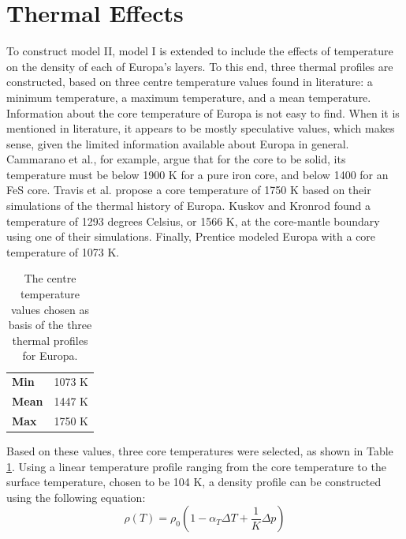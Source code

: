 \documentclass[twocolumn]{article}
\begin{document}
\section{Thermal Effects}
To construct model II, model I is extended to include the effects of temperature on the density of each of Europa's layers. To this end, three thermal profiles are constructed, based on three centre temperature values found in literature: a minimum temperature, a maximum temperature, and a mean temperature.\\
Information about the core temperature of Europa is not easy to find. When it is mentioned in literature, it appears to be mostly speculative values, which makes sense, given the limited information available about Europa in general. Cammarano et al.\cite{cammaranoLongperiodSeismologyEuropa2006}, for example, argue that for the core to be solid, its temperature must be below 1900 K for a pure iron core, and below 1400 for an FeS core. Travis et al.\cite{travisWholemoonThermalHistory2012} propose a core temperature of 1750 K based on their simulations of the thermal history of Europa. Kuskov and Kronrod\cite{kronrodChemicalDifferentiationGalilean2006} found a temperature of 1293 degrees Celsius, or 1566 K, at the core-mantle boundary using one of their simulations. Finally, Prentice\cite{prenticeORIGINBULKCHEMICAL1999} modeled Europa with a core temperature of 1073 K.\\
\begin{table}[h]
	\centering
	\caption{The centre temperature values chosen as basis of the three thermal profiles for Europa.}
	\label{tab:coretemps}
		\begin{tabular}{l|l}
			\textbf{Min}  & 1073 K \\
			\textbf{Mean} & 1447 K \\
			\textbf{Max}  & 1750 K
		\end{tabular}%
\end{table}
Based on these values, three core temperatures were selected, as shown in Table \ref{tab:coretemps}. Using a linear temperature profile ranging from the core temperature to the surface temperature, chosen to be 104 K\cite{howellLikelyThicknessEuropas2021}, a density profile can be constructed using the following equation:
\begin{equation}
	\label{eq:temperature}
	\rho(T) = \rho_0(1-\alpha_T\Delta T + \frac{1}{K}\Delta p)
\end{equation}
\end{document}
